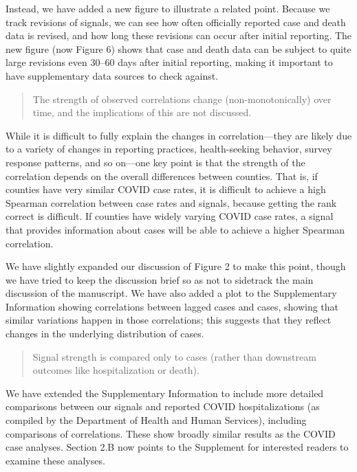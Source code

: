 \documentclass[11pt]{article}
\begin{document}
Instead, we have added a new figure to illustrate a related point. Because we
track revisions of signals, we can see how often officially reported case and
death data is revised, and how long these revisions can occur after initial
reporting. The new figure (now Figure 6) shows that case and death data can be
subject to quite large revisions even 30--60 days after initial reporting,
making it important to have supplementary data sources to check against.

\begin{quote}
  The strength of observed correlations change (non-monotonically) over time,
  and the implications of this are not discussed.
\end{quote}
While it is difficult to fully explain the changes in correlation---they are
likely due to a variety of changes in reporting practices, health-seeking
behavior, survey response patterns, and so on---one key point is that the
strength of the correlation depends on the overall differences between counties.
That is, if counties have very similar COVID case rates, it is difficult to
achieve a high Spearman correlation between case rates and signals, because
getting the rank correct is difficult. If counties have widely varying COVID
case rates, a signal that provides information about cases will be able to
achieve a higher Spearman correlation.

We have slightly expanded our discussion of Figure 2 to make this point, though
we have tried to keep the discussion brief so as not to sidetrack the main
discussion of the manuscript. We have also added a plot to the Supplementary
Information showing correlations between lagged cases and cases, showing that
similar variations happen in those correlations; this suggests that they reflect
changes in the underlying distribution of cases.

\begin{quote}
  Signal strength is compared only to cases (rather than downstream outcomes
  like hospitalization or death).
\end{quote}
We have extended the Supplementary Information to include more detailed
comparisons between our signals and reported COVID hospitalizations (as compiled
by the Department of Health and Human Services), including comparisons of
correlations. These show broadly similar results as the COVID case analyses.
Section 2.B now points to the Supplement for interested readers to examine these
analyses.
\end{document}
